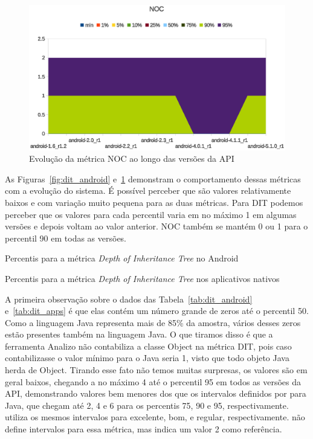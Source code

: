 \begin{figure}[!htb]
\centering
\includegraphics [keepaspectratio=true,scale=0.85]{figuras/graphs/noc_android.eps}
\caption{Evolução da métrica NOC ao longo das versões da API}
\label{fig:noc_android}
\end{figure}

As Figuras~\ref{fig:dit_android} e~\ref{fig:noc_android} demonstram o comportamento dessas métricas com a evolução do sistema. É possível perceber que são valores relativamente baixos e com variação muito pequena para as duas métricas. Para DIT podemos perceber que os valores para cada percentil varia em no máximo 1 em algumas versões e depois voltam ao valor anterior. NOC também se mantém 0 ou 1 para o percentil 90 em todas as versões.

\begin{table}[!htb]

\caption{Percentis para a métrica \textit{Depth of Inheritance Tree} no Android}
\label{tab:dit_android}
\end{table}

\begin{table}[!htb]

\caption{Percentis para a métrica \textit{Depth of Inheritance Tree} nos aplicativos nativos}
\label{tab:dit_apps}
\end{table}

A primeira observação sobre o dados das Tabela~\ref{tab:dit_android} e~\ref{tab:dit_apps} é que elas contém um número grande de zeros até o percentil 50. Como a linguagem Java representa mais de 85\% da amostra, vários desses zeros estão presentes também na linguagem Java. O que tiramos disso é que a ferramenta Analizo não contabiliza a classe Object na métrica DIT, pois caso contabilizasse o valor mínimo para o Java seria 1, visto que todo objeto Java herda de Object. Tirando esse fato não temos muitas surpresas, os valores são em geral baixos, chegando a no máximo 4 até o percentil 95 em todos as versões da API, demonstrando valores bem menores dos que os intervalos definidos por  para Java, que chegam até 2, 4 e 6 para os percentis 75, 90 e 95, respectivamente.  utiliza os mesmos intervalos para excelente, bom, e regular, respectivamente.  não define intervalos para essa métrica, mas indica um valor 2 como referência.

